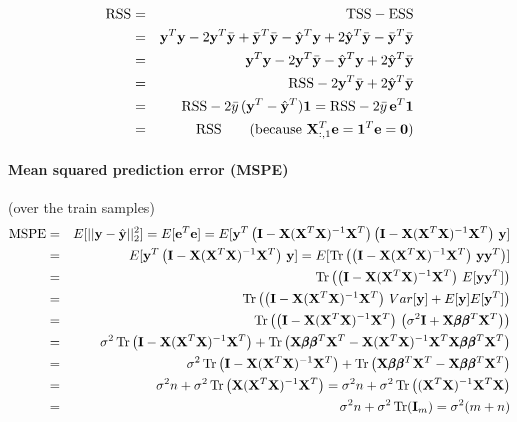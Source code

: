 \begin{eqnarray*}
\text{RSS} & = & \text{TSS} - \text{ESS} \\ 
& = & \by^T \by - 2 \by^T \bar{\by} + \bar{\by}^T \bar{\by}
- \hat{\by}^T \by + 2 \hat{\by}^T \bar{\by} - \bar{\by}^T \bar{\by}  \\
& = & \by^T \by - 2 \by^T \bar{\by}
- \hat{\by}^T \by + 2 \hat{\by}^T \bar{\by}  \\
& = & \text{RSS} - 2 \by^T \bar{\by} + 2 \hat{\by}^T \bar{\by} \\
& = & \text{RSS} - 2 \bar{y} \, (\by^T - \hat{\by}^T) \vc{1} = \text{RSS} - 2 \bar{y} \, \be^T \vc{1} \\
& = & \text{RSS} \qquad (\text{because } \bX_{:,1}^T \be = \vc{1}^T \be = \vc{0})\\
\end{eqnarray*}

\paragraph{Mean squared prediction error (MSPE)} (over the train samples)
\begin{eqnarray*}
\text{MSPE} & = &
E[||\by - \hat{\by}||_2^2] = E[\be^T \be] = 
E[ \by^T \left(\bI - \bX (\bX^T \bX)^{-1} \bX^T \right) \left(\bI - \bX (\bX^T \bX)^{-1} \bX^T \right) \, \by] \\
& = & E[ \by^T \left(\bI - \bX (\bX^T \bX)^{-1} \bX^T \right) \, \by]
= E[ \Tr \left( \left(\bI - \bX (\bX^T \bX)^{-1} \bX^T \right) \, \by \by^T \right) ] \\
& = & \Tr \left( \left(\bI - \bX (\bX^T \bX)^{-1} \bX^T \right) \, E[ \by \by^T ] \right) \\
& = & \Tr \left( \left(\bI - \bX (\bX^T \bX)^{-1} \bX^T \right) \, Var[ \by ] + E[\by]E[\by^T] \right) \\
& = & \Tr \left( \left(\bI - \bX (\bX^T \bX)^{-1} \bX^T \right) \, 
\left(\sigma^2 \bI + \bX \pb \pb^T \bX^T \right)\right) \\
& = & \sigma^2  \Tr \left(\bI - \bX (\bX^T \bX)^{-1} \bX^T \right)
+ \Tr \left( \bX \pb \pb^T \bX^T - \bX (\bX^T \bX)^{-1} \bX^T \bX \pb \pb^T \bX^T \right) \\
& = & \sigma^2  \Tr \left(\bI - \bX (\bX^T \bX)^{-1} \bX^T \right)
+ \Tr \left( \bX \pb \pb^T \bX^T - \bX \pb \pb^T \bX^T \right) \\
& = & \sigma^2 n + \sigma^2 \Tr \left(\bX (\bX^T \bX)^{-1} \bX^T \right) = \sigma^2 n + \sigma^2 \Tr \left((\bX^T \bX)^{-1} \bX^T \bX \right) \\
& = & \sigma^2 n + \sigma^2 \Tr (\bI_m) = \sigma^2 (m+n)
\end{eqnarray*}


